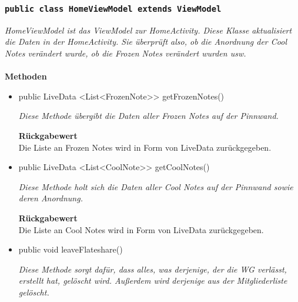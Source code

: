             
            		\subsubsection{\texttt{public class HomeViewModel extends ViewModel}}
        \textit{HomeViewModel ist das ViewModel zur HomeActivity. Diese Klasse aktualisiert die Daten in der HomeActivity. Sie überprüft also, ob die Anordnung der Cool Notes verändert wurde, ob die Frozen Notes verändert wurden usw.}\\      
        \\
		\textbf{Methoden} \\
 			\begin{itemize}
        		\item{public LiveData <List<FrozenNote>> getFrozenNotes()}
        	
        		\textit{Diese Methode übergibt die Daten aller Frozen Notes auf der Pinnwand.}
        		
        		\textbf{Rückgabewert} \\
				Die Liste an Frozen Notes wird in Form von LiveData zurückgegeben.
        	
        		\item{public LiveData <List<CoolNote>> getCoolNotes()}

        		\textit{Diese Methode holt sich die Daten aller Cool Notes auf der Pinnwand sowie deren Anordnung.}
        		
        		\textbf{Rückgabewert} \\
				Die Liste an Cool Notes wird in Form von LiveData zurückgegeben.
				
				\item{public void leaveFlateshare()}
        	
        		\textit{Diese Methode sorgt dafür, dass alles, was derjenige, der die WG verlässt, erstellt hat, gelöscht wird. Außerdem wird derjenige aus der Mitgliederliste gelöscht.}
        		
       		 \end{itemize}
             
             
